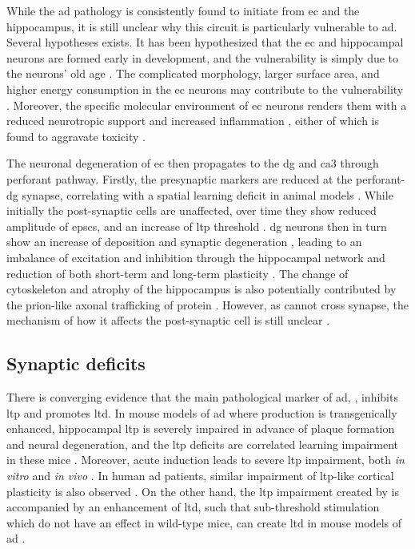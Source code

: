While the \gls{ad} pathology is consistently found to initiate from \gls{ec} and the hippocampus, it is still unclear why this circuit is particularly vulnerable to \gls{ad}. Several hypotheses exists. It has been hypothesized that the \gls{ec} and hippocampal neurons are formed early in development, and the vulnerability is simply due to the neurons' old age \citep{rakic81}. The complicated morphology, larger surface area, and higher energy consumption in the \gls{ec} neurons may contribute to the vulnerability \citep{hevner92, buckmaster04}. Moreover, the specific molecular environment of \gls{ec} neurons renders them with a reduced neurotropic support \citep{narisawa-saito96, peterson96} and increased inflammation \citep{janelsins05, okun10}, either of which is found to aggravate \abeta{} toxicity \citep{tang08, stranahan10}.

The neuronal degeneration of \gls{ec} then propagates to the \gls{dg} and \gls{ca3} through perforant pathway. Firstly, the presynaptic markers are reduced at the perforant-\gls{dg} synapse, correlating with a spatial learning deficit in animal models \citep{smith00}. While initially the post-synaptic cells are unaffected, over time they show reduced amplitude of \glspl{epsc}, and an increase of \gls{ltp} threshold \citep{calhoun08, barnes80, barnes00}. \Gls{dg} neurons then in turn show an increase of \abeta{} deposition and synaptic degeneration \citep{reilly03, dong07}, leading to an imbalance of excitation and inhibition through the hippocampal network and reduction of both short-term and long-term plasticity \citep{palop07}. The change of cytoskeleton and atrophy of the hippocampus is also potentially contributed by the prion-like axonal trafficking of \atau{} protein \citep{clavaguera09}. However, as \atau{} cannot cross synapse, the mechanism of how it affects the post-synaptic cell is still unclear \citep{stranahan10}.  

\subsection{Synaptic deficits \label{ad.synaptic}}

There is converging evidence that the main pathological marker of \gls{ad}, \abeta{}, inhibits \gls{ltp} and promotes \gls{ltd}. In mouse models of \gls{ad} where \abeta{} production is transgenically enhanced, hippocampal \gls{ltp} is severely impaired in advance of plaque formation and neural degeneration, and the \gls{ltp} deficits are correlated learning impairment in these mice \citep{hsia99, chapman99, roberson11}. Moreover, acute \abeta{} induction leads to severe \gls{ltp} impairment, both \textit{in vitro} \citep{lambert98, shankar08} and \textit{in vivo} \citep{walsh02, hu08}. In human \gls{ad} patients, similar impairment of \gls{ltp}-like cortical plasticity is also observed \citep{inghilleri06, koch12}. On the other hand, the \gls{ltp} impairment created by \abeta{} is accompanied by an enhancement of \gls{ltd}, such that sub-threshold stimulation which do not have an effect in wild-type mice, can create \gls{ltd} in mouse models of \gls{ad} \citep{hsia99, fitzjohn01, jacobsen06}. 

